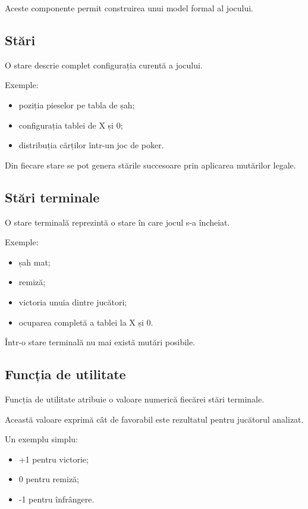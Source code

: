 \documentclass[12pt,a4paper]{article}
\begin{document}
Aceste componente permit construirea unui model formal al jocului.

\subsection{Stări}

O stare descrie complet configurația curentă a jocului.

Exemple:

\begin{itemize}
\item poziția pieselor pe tabla de șah;
\item configurația tablei de X și 0;
\item distribuția cărților într-un joc de poker.
\end{itemize}

Din fiecare stare se pot genera stările succesoare prin aplicarea mutărilor legale.

\subsection{Stări terminale}

O stare terminală reprezintă o stare în care jocul s-a încheiat.

Exemple:

\begin{itemize}
\item șah mat;
\item remiză;
\item victoria unuia dintre jucători;
\item ocuparea completă a tablei la X și 0.
\end{itemize}

Într-o stare terminală nu mai există mutări posibile.

\subsection{Funcția de utilitate}

Funcția de utilitate atribuie o valoare numerică fiecărei stări terminale.

Această valoare exprimă cât de favorabil este rezultatul pentru jucătorul analizat.

Un exemplu simplu:

\begin{itemize}
\item +1 pentru victorie;
\item 0 pentru remiză;
\item -1 pentru înfrângere.
\end{itemize}
\end{document}
